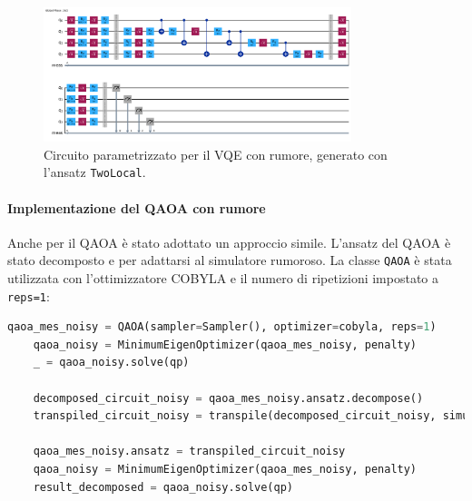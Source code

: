 \begin{figure}[h!]
    \centering
    \includegraphics[width=0.8\textwidth]{images/circuitoVQEnoisy.png}
    \caption{Circuito parametrizzato per il VQE con rumore, generato con l'ansatz \texttt{TwoLocal}.}
    \label{fig:vqe_noisy_circuit}
\end{figure}

\paragraph{Implementazione del QAOA con rumore}
Anche per il QAOA è stato adottato un approccio simile. L'ansatz del QAOA è stato 
decomposto e  per adattarsi al simulatore rumoroso. La classe 
\texttt{QAOA} è stata utilizzata con l'ottimizzatore COBYLA e il numero di ripetizioni 
impostato a \texttt{reps=1}:

\begin{lstlisting}[language=python, caption={\mmerenda{fix questo codice (è sbagliato)}}]
    qaoa_mes_noisy = QAOA(sampler=Sampler(), optimizer=cobyla, reps=1)
    qaoa_noisy = MinimumEigenOptimizer(qaoa_mes_noisy, penalty)
    _ = qaoa_noisy.solve(qp)
    
    decomposed_circuit_noisy = qaoa_mes_noisy.ansatz.decompose()
    transpiled_circuit_noisy = transpile(decomposed_circuit_noisy, simulator)
    
    qaoa_mes_noisy.ansatz = transpiled_circuit_noisy
    qaoa_noisy = MinimumEigenOptimizer(qaoa_mes_noisy, penalty)
    result_decomposed = qaoa_noisy.solve(qp)
\end{lstlisting}


